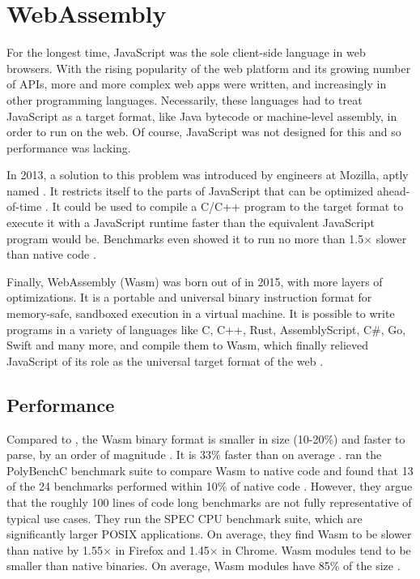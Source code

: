 \section{WebAssembly}

For the longest time, JavaScript was the sole client-side language in web browsers. With the rising popularity of the web platform and its growing number of APIs, more and more complex web apps were written, and increasingly in other programming languages. Necessarily, these languages had to treat JavaScript as a target format, like Java bytecode or machine-level assembly, in order to run on the web. Of course, JavaScript was not designed for this and so performance was lacking.

In 2013, a solution to this problem was introduced by engineers at Mozilla, aptly named . It restricts itself to the parts of JavaScript that can be optimized ahead-of-time \cite{Herman2014}. It could be used to compile a C/C++ program to the  target format to execute it with a JavaScript runtime faster than the equivalent JavaScript program would be. Benchmarks even showed it to run no more than 1.5$\times$ slower than native code \cite{Zakai2013}.

Finally, WebAssembly (Wasm) was born out of  in 2015, with more layers of optimizations. It is a portable and universal binary instruction format for memory-safe, sandboxed execution in a virtual machine.
It is possible to write programs in a variety of languages like C, C++, Rust, AssemblyScript, C\#, Go, Swift and many more, and compile them to Wasm, which finally relieved JavaScript of its role as the universal target format of the web \cite{W3C2020}.

\subsection{Performance}

Compared to , the Wasm binary format is smaller in size (10-20\%) and faster to parse, by an order of magnitude
\cite{Clark2019}. It is 33\% faster than  on average \cite{Haas2017}.
\citeauthor{NotSoFast} ran the PolyBenchC benchmark suite to compare Wasm to native code and found that 13 of the 24 benchmarks performed within 10\% of native code \cite{NotSoFast}. However, they argue that the roughly 100 lines of code long benchmarks are not fully representative of typical use cases. They run the SPEC CPU benchmark suite, which are significantly larger POSIX applications. On average, they find Wasm to be slower than native by 1.55$\times$ in Firefox and 1.45$\times$ in Chrome.
Wasm modules tend to be smaller than native  binaries. On average, Wasm modules have 85\% of the size \cite{Haas2017}.

